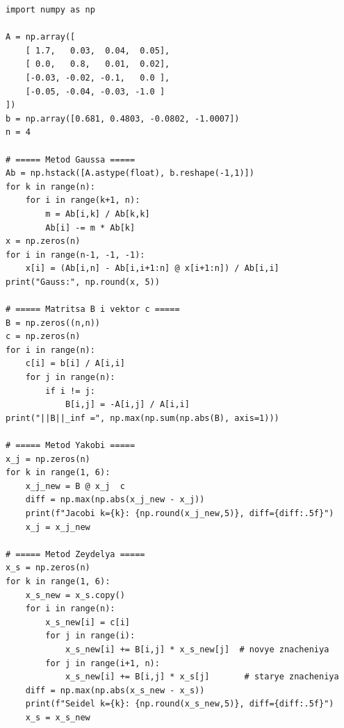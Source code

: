 \documentclass[a4paper, final]{article}
\begin{document}
\begin{lstlisting}[caption={Метод Гаусса и итерационные методы}, label=lst:code]
import numpy as np

A = np.array([
    [ 1.7,   0.03,  0.04,  0.05],
    [ 0.0,   0.8,   0.01,  0.02],
    [-0.03, -0.02, -0.1,   0.0 ],
    [-0.05, -0.04, -0.03, -1.0 ]
])
b = np.array([0.681, 0.4803, -0.0802, -1.0007])
n = 4

# ===== Metod Gaussa =====
Ab = np.hstack([A.astype(float), b.reshape(-1,1)])
for k in range(n):
    for i in range(k+1, n):
        m = Ab[i,k] / Ab[k,k]
        Ab[i] -= m * Ab[k]
x = np.zeros(n)
for i in range(n-1, -1, -1):
    x[i] = (Ab[i,n] - Ab[i,i+1:n] @ x[i+1:n]) / Ab[i,i]
print("Gauss:", np.round(x, 5))

# ===== Matritsa B i vektor c =====
B = np.zeros((n,n))
c = np.zeros(n)
for i in range(n):
    c[i] = b[i] / A[i,i]
    for j in range(n):
        if i != j:
            B[i,j] = -A[i,j] / A[i,i]
print("||B||_inf =", np.max(np.sum(np.abs(B), axis=1)))

# ===== Metod Yakobi =====
x_j = np.zeros(n)
for k in range(1, 6):
    x_j_new = B @ x_j  c
    diff = np.max(np.abs(x_j_new - x_j))
    print(f"Jacobi k={k}: {np.round(x_j_new,5)}, diff={diff:.5f}")
    x_j = x_j_new

# ===== Metod Zeydelya =====
x_s = np.zeros(n)
for k in range(1, 6):
    x_s_new = x_s.copy()
    for i in range(n):
        x_s_new[i] = c[i]
        for j in range(i):
            x_s_new[i] += B[i,j] * x_s_new[j]  # novye znacheniya
        for j in range(i+1, n):
            x_s_new[i] += B[i,j] * x_s[j]       # starye znacheniya
    diff = np.max(np.abs(x_s_new - x_s))
    print(f"Seidel k={k}: {np.round(x_s_new,5)}, diff={diff:.5f}")
    x_s = x_s_new
\end{lstlisting}
\end{document}
